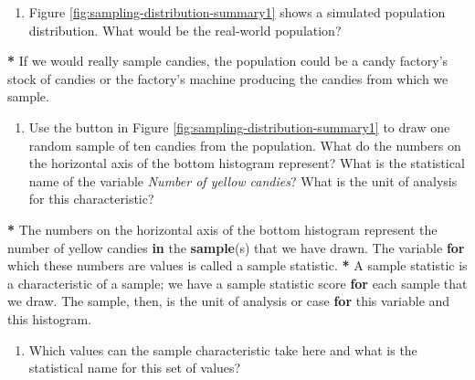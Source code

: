\documentclass[a4paper]{book}
\newenvironment{Shaded}{\begin{snugshade}}{\end{snugshade}}
\newcommand{\KeywordTok}[1]{\textcolor[rgb]{0,0,0}{\textbf{#1}}}
\newcommand{\StringTok}[1]{\textcolor[rgb]{0.00,0.00,0.00}{#1}}
\newcommand{\ControlFlowTok}[1]{\textcolor[rgb]{0.00,0.00,0.00}{\textbf{#1}}}
\newcommand{\OperatorTok}[1]{\textcolor[rgb]{0.00,0.00,0.00}{\textbf{#1}}}
\newcommand{\NormalTok}[1]{#1}
\providecommand{\tightlist}{%
  \setlength{\itemsep}{0pt}\setlength{\parskip}{0pt}}
\theoremstyle{definition}
\theoremstyle{definition}
\theoremstyle{definition}
\theoremstyle{remark}
\begin{document}
\begin{enumerate}
\def\labelenumi{\arabic{enumi}.}
\tightlist
\item
  Figure \ref{fig:sampling-distribution-summary1} shows a simulated
  population distribution. What would be the real-world population?
\end{enumerate}

\begin{Shaded}
\begin{Highlighting}[]
\OperatorTok{*}\StringTok{ }\NormalTok{If we would really sample candies, the population could be a candy factory}\StringTok{'s}
\StringTok{stock of candies or the factory'}\NormalTok{s machine producing the candies from which we}
\NormalTok{sample.}
\end{Highlighting}
\end{Shaded}

\begin{enumerate}
\def\labelenumi{\arabic{enumi}.}
\setcounter{enumi}{1}
\tightlist
\item
  Use the button in Figure \ref{fig:sampling-distribution-summary1} to
  draw one random sample of ten candies from the population. What do the
  numbers on the horizontal axis of the bottom histogram represent? What
  is the statistical name of the variable \emph{Number of yellow
  candies}? What is the unit of analysis for this characteristic?
\end{enumerate}

\begin{Shaded}
\begin{Highlighting}[]
\OperatorTok{*}\StringTok{ }\NormalTok{The numbers on the horizontal axis of the bottom histogram represent the}
\NormalTok{number of yellow candies }\ControlFlowTok{in}\NormalTok{ the }\KeywordTok{sample}\NormalTok{(s) that we have drawn. The variable }\ControlFlowTok{for}
\NormalTok{which these numbers are values is called a sample statistic.}
\OperatorTok{*}\StringTok{ }\NormalTok{A sample statistic is a characteristic of a sample; we have a sample}
\NormalTok{statistic score }\ControlFlowTok{for}\NormalTok{ each sample that we draw. The sample, then, is the unit of}
\NormalTok{analysis or case }\ControlFlowTok{for}\NormalTok{ this variable and this histogram.}
\end{Highlighting}
\end{Shaded}

\begin{enumerate}
\def\labelenumi{\arabic{enumi}.}
\setcounter{enumi}{2}
\tightlist
\item
  Which values can the sample characteristic take here and what is the
  statistical name for this set of values?
\end{enumerate}
\end{document}
